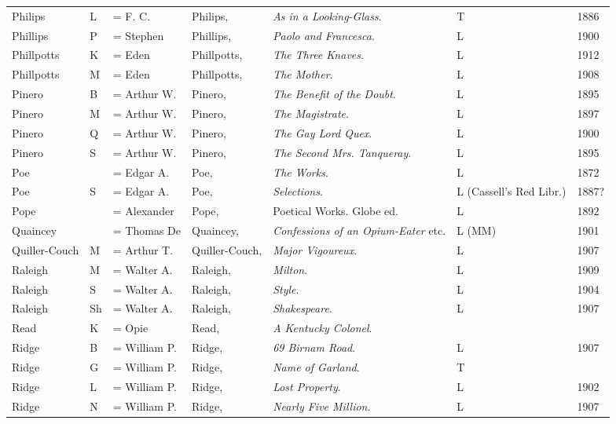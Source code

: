 \begin{sidewaystable}
\centering
\begin{tabular}{p{} p{} p{} p{} p{} p{} p{}}
Philips & L & = F. C. & Philips, & \textit{As in a Looking-Glass}. & T & 1886 \\
Phillips & P & = Stephen & Phillips, & \textit{Paolo and Francesca}. & L & 1900 \\
Phillpotts & K & = Eden & Phillpotts, & \textit{The Three Knaves}. & L & 1912 \\
Phillpotts & M & = Eden & Phillpotts, & \textit{The Mother}. & L & 1908 \\
Pinero & B & = Arthur W. & Pinero, & \textit{The Benefit of the Doubt}. & L & 1895 \\
Pinero & M & = Arthur W. & Pinero, & \textit{The Magistrate}. & L & 1897 \\
Pinero & Q & = Arthur W. & Pinero, & \textit{The Gay Lord Quex}. & L & 1900 \\
Pinero & S & = Arthur W. & Pinero, & \textit{The Second Mrs. Tanqueray}. & L & 1895 \\
Poe & & =  Edgar A. & Poe, & \textit{The Works}. & L & 1872 \\
Poe & S & =  Edgar A. & Poe, & \textit{Selections}. & L (Cassell's Red Libr.) & 1887? \\
Pope & & = Alexander & Pope, & Poetical Works. Globe ed. & L & 1892 \\
Quaincey & & = Thomas De & Quaincey, & \textit{Confessions of an Opium-Eater} etc. & L (MM) & 1901\\
Quiller-Couch & M & = Arthur T. & Quiller-Couch, & \textit{Major Vigoureux}. & L & 1907 \\
Raleigh & M & = Walter A. & Raleigh, & \textit{Milton}. & L & 1909 \\
Raleigh & S & = Walter A. & Raleigh, & \textit{Style}. & L & 1904 \\
Raleigh & Sh & = Walter A. & Raleigh, & \textit{Shakespeare}. & L & 1907 \\
Read & K & = Opie & Read, & \textit{A Kentucky Colonel}. & & \\
Ridge & B & = William P. & Ridge, & \textit{69 Birnam Road}. & L & 1907 \\
Ridge & G & = William P. & Ridge, & \textit{Name of Garland}. & T & \\
Ridge & L & = William P. & Ridge, & \textit{Lost Property}. & L & 1902 \\
Ridge & N & = William P. & Ridge, & \textit{Nearly Five Million}. & L & 1907 \\
\end{tabular}
\end{sidewaystable}


